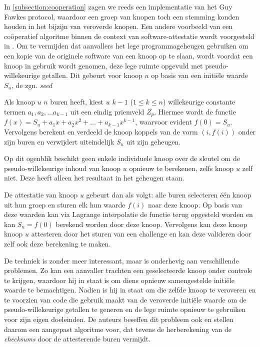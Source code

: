 In \ref{subsection:cooperation} zagen we reeds een implementatie van het Guy
Fawkes protocol, waardoor een groep van knopen toch een stemming konden houden
in het bijzijn van veroverde knopen. Een andere voorbeeld van een co\"operatief
algoritme binnen de context van software-attestatie wordt voorgesteld in
\citep{yang2007distributed}. Om te vermijden dat aanvallers het lege programmageheugen gebruiken om een kopie van de originele software van een knoop op te
slaan, wordt voordat een knoop in gebruik wordt genomen, deze lege ruimte
opgevuld met pseudo-willekeurige getallen. Dit gebeurt voor knoop $u$ op basis
van een initi\"ele waarde $S_u$, de zgn. \emph{seed}

Als knoop $u$ $n$ buren heeft, kiest $u$ $k - 1$ ($1 \leq k \leq n$)
willekeurige constante termen $a_1, a_2,\dots a_{k-1}$ uit een eindig
priemveld $Z_p$. Hiermee wordt de functie $f(x) = S_u + a_1 x+a_2 x^2 +\dots +
a_{k-1} x^{k-1}$, waarvoor evident $f(0) = S_u$. Vervolgens berekent en
verdeeld de knoop koppels van de vorm $(i,f(i))$ onder zijn buren en verwijdert
uiteindelijk $S_u$ uit zijn geheugen.

Op dit ogenblik beschikt geen enkele individuele knoop over de sleutel om de
pseudo-willekeurige inhoud van knoop $u$ opnieuw te berekenen, zelfs knoop $u$
zelf niet. Deze heeft alleen het resultaat in het geheugen staan.

De attestatie van knoop $u$ gebeurt dan als volgt: alle buren selecteren
\'e\'en knoop uit hun groep en sturen elk hun waarde $f(i)$ naar deze knoop. Op
basis van deze waarden kan via Lagrange interpolatie de functie terug opgesteld
worden en kan $S_u = f(0)$ berekend worden door deze knoop. Vervolgens kan deze
knoop knoop $u$ attesteren door het sturen van een challenge en kan deze
valideren door zelf ook deze berekening te maken.

De techniek is zonder meer interessant, maar is onderhevig aan verschillende
problemen. Zo kan een aanvaller trachten een geselecteerde knoop onder controle
te krijgen, waardoor hij in staat is om diens opnieuw samengestelde initi\"ele
waarde te bemachtigen. Nadien is hij in staat om die zelfde knoop te veroveren
en te voorzien van code die gebruik maakt van de veroverde initi\"ele waarde om
de pseudo-willekeurige getallen te generen en de lege ruimte opnieuw te
gebruiken voor zijn eigen doeleinden. De auteurs beseffen dit probleem ook en
stellen daarom een aangepast algoritme voor, dat tevens de herberekening van de
\emph{checksums} door de attesterende buren vermijdt.

